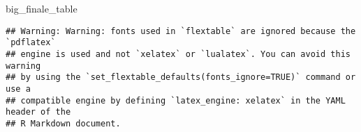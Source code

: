 \documentclass[
]{article}
\newenvironment{Shaded}{\begin{snugshade}}{\end{snugshade}}
\newcommand{\NormalTok}[1]{#1}
\begin{document}
\begin{Shaded}
\begin{Highlighting}[]
\NormalTok{big_finale_table}
\end{Highlighting}
\end{Shaded}

\begin{verbatim}
## Warning: Warning: fonts used in `flextable` are ignored because the `pdflatex`
## engine is used and not `xelatex` or `lualatex`. You can avoid this warning
## by using the `set_flextable_defaults(fonts_ignore=TRUE)` command or use a
## compatible engine by defining `latex_engine: xelatex` in the YAML header of the
## R Markdown document.
\end{verbatim}

\providecommand{\docline}[3]{\noalign{\global\setlength{\arrayrulewidth}{#1}}\arrayrulecolor[HTML]{#2}\cline{#3}}

\setlength{\tabcolsep}{2pt}

\renewcommand*{\arraystretch}{1.5}
\end{document}

